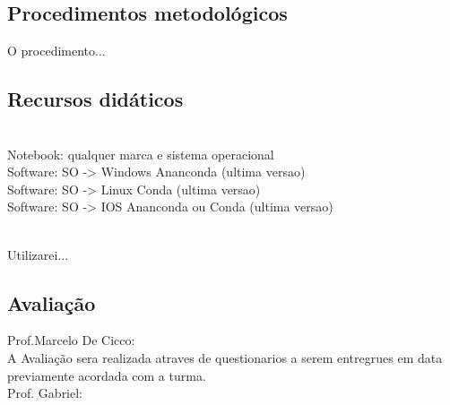 \documentclass[oneside,a4paper,12pt]{article}
\begin{document}
	\begin{snugshade}
		\section{Procedimentos metodológicos} %
	\end{snugshade}
	O procedimento...  
	
	\begin{snugshade}
		\section{Recursos didáticos} 
		
\\

\noindent Notebook: qualquer marca e sistema operacional\\

\noindent Software: SO -> Windows Ananconda (ultima versao)\\
\noindent Software: SO -> Linux Conda (ultima versao)\\
\noindent Software: SO -> IOS Ananconda ou Conda (ultima versao)\\

\noindent\\[0.3cm]

		
		
		
	\end{snugshade}
		Utilizarei...
	
	\begin{snugshade}
		\section{Avaliação} %
	\end{snugshade}
	Prof.Marcelo De Cicco:\\
	A Avaliação sera realizada atraves de questionarios a serem entregrues em data previamente acordada com a turma.\\
	\vspace{12pt} 
	Prof. Gabriel:\\
	
	\vspace{12pt}
	
\end{document}
